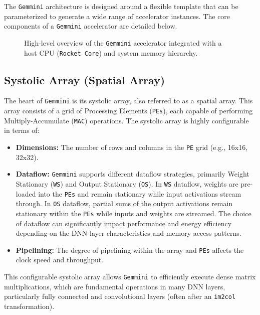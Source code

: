 The \texttt{Gemmini} architecture is designed around a flexible template that can be parameterized to generate a wide range of accelerator instances. The core components of a \texttt{Gemmini} accelerator are detailed below.

\begin{figure}[h!]
    \centering
    \caption{High-level overview of the \texttt{Gemmini} accelerator integrated with a host CPU (\texttt{Rocket Core}) and system memory hierarchy.}
    \label{fig:gemmini_soc_overview}
\end{figure}

\subsection{Systolic Array (Spatial Array)}
\label{subsec:gemmini_systolic_array}
The heart of \texttt{Gemmini} is its systolic array, also referred to as a spatial array. This array consists of a grid of Processing Elements (\texttt{PEs}), each capable of performing Multiply-Accumulate (\texttt{MAC}) operations. The systolic array is highly configurable in terms of:
\begin{itemize}
    \item \textbf{Dimensions:} The number of rows and columns in the \texttt{PE} grid (e.g., 16x16, 32x32).
    \item \textbf{Dataflow:} \texttt{Gemmini} supports different dataflow strategies, primarily Weight Stationary (\texttt{WS}) and Output Stationary (\texttt{OS}). In \texttt{WS} dataflow, weights are pre-loaded into the \texttt{PEs} and remain stationary while input activations stream through. In \texttt{OS} dataflow, partial sums of the output activations remain stationary within the \texttt{PEs} while inputs and weights are streamed. The choice of dataflow can significantly impact performance and energy efficiency depending on the DNN layer characteristics and memory access patterns.
    \item \textbf{Pipelining:} The degree of pipelining within the array and \texttt{PEs} affects the clock speed and throughput.
\end{itemize}
This configurable systolic array allows \texttt{Gemmini} to efficiently execute dense matrix multiplications, which are fundamental operations in many DNN layers, particularly fully connected and convolutional layers (often after an \texttt{im2col} transformation).

